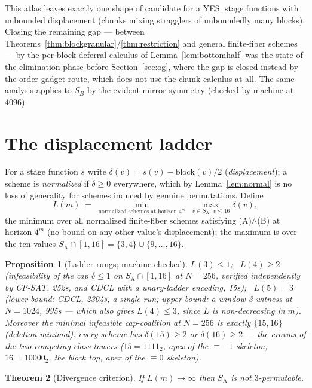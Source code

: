\documentclass[11pt]{article}
\newtheorem{theorem}{Theorem}
\newtheorem{proposition}[theorem]{Proposition}
\theoremstyle{definition}
\newcommand{\SA}{S_{\mathrm{A}}}
\begin{document}
\medskip
This atlas leaves exactly one shape of candidate for a YES: stage functions
with unbounded displacement (chunks mixing stragglers of unboundedly many
blocks). Closing the remaining gap --- between
Theorems~\ref{thm:blockgranular}/\ref{thm:restriction} and general
finite-fiber schemes --- by the per-block deferral calculus of
Lemma~\ref{lem:bottomhalf} was the state of the elimination phase before
Section~\ref{sec:og}, where the gap is closed instead by the order-gadget
route, which does not use the chunk calculus at all. The same analysis
applies to $S_B$ by the evident mirror symmetry (checked by machine at
$4096$).

\section{The displacement ladder}\label{sec:ladder}

For a stage function $s$ write $\delta(v) = s(v) - \mathrm{block}(v)/2$
(\emph{displacement}); a scheme is \emph{normalized} if $\delta \ge 0$
everywhere, which by Lemma~\ref{lem:normal} is no loss of generality for
schemes induced by genuine permutations. Define
\[
L(m) \;=\; \min_{\text{normalized schemes at horizon } 4^m}\
\max_{v \in \SA,\ v \le 16} \delta(v),
\]
the minimum over all normalized finite-fiber schemes satisfying
(A)$\wedge$(B) at horizon $4^m$ (no bound on any other value's
displacement); the maximum is over the ten values
$\SA \cap [1,16] = \{3,4\} \cup \{9, \dots, 16\}$.

\begin{proposition}[Ladder rungs; machine-checked]
$L(3) \le 1$; \ $L(4) \ge 2$ (infeasibility of the cap $\delta \le 1$ on
$\SA \cap [1,16]$ at $N=256$, verified independently by CP-SAT, 252s, and
CDCL with a unary-ladder encoding, 15s); \ $L(5) = 3$ (lower bound: CDCL,
2304s, a single run; upper bound: a window-3 witness at $N=1024$, 995s ---
which also gives $L(4) \le 3$, since $L$ is non-decreasing in $m$).
Moreover the minimal infeasible cap-coalition at $N=256$ is exactly
$\{15, 16\}$ (deletion-minimal): every scheme has $\delta(15) \ge 2$ or
$\delta(16) \ge 2$ --- the crowns of the two competing class towers
($15 = 1111_2$, apex of the $\equiv -1$ skeleton; $16 = 10000_2$, the block
top, apex of the $\equiv 0$ skeleton).
\end{proposition}

\begin{theorem}[Divergence criterion]\label{thm:divergence}
If $L(m) \to \infty$ then $\SA$ is not $3$-permutable.
\end{theorem}
\end{document}
